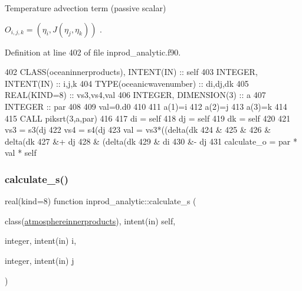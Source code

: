 Temperature advection term (passive scalar) 

$ O_{i,j,k} = (\eta_i, J(\eta_j, \eta_k))$ . 

Definition at line 402 of file inprod\+\_\+analytic.\+f90.


\begin{DoxyCode}
402     \textcolor{keywordtype}{CLASS}(oceaninnerproducts), \textcolor{keywordtype}{INTENT(IN)} :: self
403     \textcolor{keywordtype}{INTEGER}, \textcolor{keywordtype}{INTENT(IN)} :: i,j,k
404     \textcolor{keywordtype}{TYPE}(oceanicwavenumber) :: di,dj,dk
405     \textcolor{keywordtype}{REAL(KIND=8)} :: vs3,vs4,val
406     \textcolor{keywordtype}{INTEGER}, \textcolor{keywordtype}{DIMENSION(3)} :: a
407     \textcolor{keywordtype}{INTEGER} :: par
408 
409     val=0.d0
410 
411     a(1)=i
412     a(2)=j
413     a(3)=k
414 
415     \textcolor{keyword}{CALL }piksrt(3,a,par)
416 
417     di = self%
418     dj = self%
419     dk = self%
420 
421     vs3 = s3(dj%
422     vs4 = s4(dj%
423     val = vs3*((delta(dk%
424       &%
425       &%
426       & delta(dk%
427       &+ dj%
428       & (delta(dk%
429       & di%
430       &- dj%
431     calculate\_o = par * val * self%
\end{DoxyCode}
\mbox{\label{namespaceinprod__analytic_a3ca3072c7041b05f960b841dbcc51979}} 
\subsubsection{\texorpdfstring{calculate\+\_\+s()}{calculate\_s()}}
{\footnotesize\ttfamily real(kind=8) function inprod\+\_\+analytic\+::calculate\+\_\+s (\begin{DoxyParamCaption}\item[{class(\hyperlink{structinprod__analytic_1_1atmosphereinnerproducts}{atmosphereinnerproducts}), intent(in)}]{self,  }\item[{integer, intent(in)}]{i,  }\item[{integer, intent(in)}]{j }\end{DoxyParamCaption})\hspace{0.3cm}{\ttfamily [private]}}



